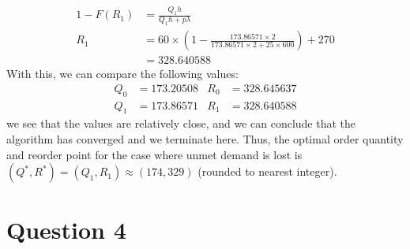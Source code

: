 \documentclass[12pt]{article}
\begin{document}
\begin{align*}
    1 - F(R_{1}) &= \frac{Q_1h}{Q_1h+p\lambda} \\ 
    R_{1} &= 60\times \left( 1 - \frac{173.86571 \times 2}{173.86571 \times 2 + 25 \times 600} \right) + 270 \\ 
    &= 328.640588
\end{align*} With this, we can compare the following values: \begin{align*}
    Q_{0} &= 173.20508 & R_{0} &= 328.645637 \\ 
    Q_{1} &= 173.86571 & R_{1} &= 328.640588
\end{align*} we see that the values are relatively close, and we can conclude that the algorithm has converged and we terminate here. Thus, the optimal order quantity and reorder point for the case where unmet demand is lost is $(Q^{*}, R^{*})  = (Q_{1}, R_{1}) \approx (174, 329)$ (rounded to nearest integer). 


\newpage

\section*{Question 4}

\end{document}
